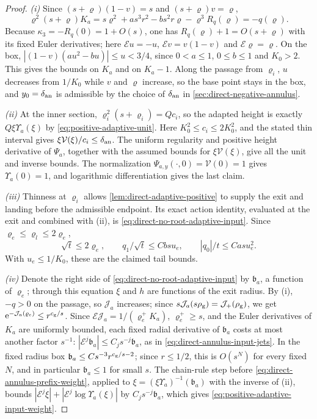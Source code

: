 \begin{proof}
\emph{(i)} Since \((s+\varrho)(1-v)=s\) and \((s+\varrho)v=\varrho\),
\[
 \varrho^2(s+\varrho)K_a
   =s\varrho^2+as^3r^2-bs^2r\varrho-\varrho^3R_q(\varrho)=-q(\varrho).
\]
Because \(\kappa_3=-R_q(0)=1+O(s)\), one has \(R_q(\varrho)+1=O(s+\varrho)\)
with its fixed Euler derivatives; here \(\mathcal Eu=-u\),
\(\mathcal Ev=v(1-v)\) and \(\mathcal E\varrho=\varrho\). On the box,
\(|(1-v)(au^2-bu)|\le u<3/4\), since \(0<a\le1\), \(0\le b\le1\) and
\(K_0>2\). This gives the bounds on \(K_a\) and on \(K_a-1\). Along the
passage from \(\varrho_i\), \(u\) decreases from \(1/K_0\) while \(v\) and
\(\varrho\) increase, so the base point stays in the box, and
\(y_0=\delta_{\rm an}\) is admissible by the choice of \(\delta_{\rm an}\)
in \cref{sec:direct-negative-annulus}.

\emph{(ii)} At the inner section,
\(\varrho_i^2(s+\varrho_i)=Qc_i\), so the adapted height is exactly
\(Q\xi\Upsilon_a(\xi)\) by \eqref{eq:positive-adaptive-unit}.
Here \(K_0^2\le c_i\le2K_0^2\), and the stated thin interval gives
\(\xi\mathcal V(\xi)/c_i\le\delta_{\rm an}\). The uniform regularity
and positive height derivative of \(\Psi_a\), together with the assumed
bounds for \(\xi\mathcal V(\xi)\), give all the unit and inverse bounds.
The normalization \(\Psi_{a,y}(\cdot,0)=\mathcal V(0)=1\) gives
\(\Upsilon_a(0)=1\), and logarithmic differentiation gives the last claim.

\emph{(iii)} Thinness at \(\varrho_i\) allows
\cref{lem:direct-adaptive-positive} to supply the exit and landing
before the admissible endpoint. Its exact action identity, evaluated
at the exit and combined with (ii), is
\eqref{eq:direct-no-root-adaptive-input}. Since
\(\varrho_e\le\varrho_l\le2\varrho_e\),
\[
 \sqrt t\le2\varrho_e,\qquad
 q_1/\sqrt t\le Cbsu_e,\qquad |q_0|/t\le Casu_e^2.
\]
With \(u_e\le1/K_0\), these are the claimed tail bounds.

\emph{(iv)} Denote the right side of
\eqref{eq:direct-no-root-adaptive-input} by \(\mathfrak b_a\), a function
of \(\varrho_e\); through this equation \(\xi\) and \(h\) are functions of
the exit radius. By (i), \(-q>0\) on the passage, so \(\mathcal J_a\) increases;
since \(s\mathcal J_a(s\rho_{\rm g})=\mathcal J_+(\rho_{\rm g})\), we get
\(\mathrm e^{-\mathcal J_a(\varrho_e)}\le r^{c_{\rm g}/s}\). Since
\(\mathcal E\mathcal J_a=1/(\varrho_e^+K_a)\), \(\varrho_e^+\ge s\), and the Euler
derivatives of \(K_a\) are uniformly bounded, each fixed radial derivative
of \(\mathfrak b_a\) costs at most another factor \(s^{-1}\):
\(|\mathcal E^j\mathfrak b_a|\le C_js^{-j}\mathfrak b_a\), as in
\eqref{eq:direct-annulus-input-jets}. In the fixed radius box
\(\mathfrak b_a\le Cs^{-3}r^{c_{\rm g}/s-2}\); since \(r\le1/2\), this is
\(O(s^N)\) for every fixed \(N\), and in particular \(\mathfrak b_a\le1\)
for small \(s\). The chain-rule step before
\eqref{eq:direct-annulus-prefix-weight}, applied to
\(\xi=(\xi\Upsilon_a)^{-1}(\mathfrak b_a)\) with the inverse of (ii),
bounds \(|\mathcal E^j\xi|+|\mathcal E^j\log\Upsilon_a(\xi)|\) by
\(C_js^{-j}\mathfrak b_a\), which gives
\eqref{eq:positive-adaptive-input-weight}.


\end{proof}
